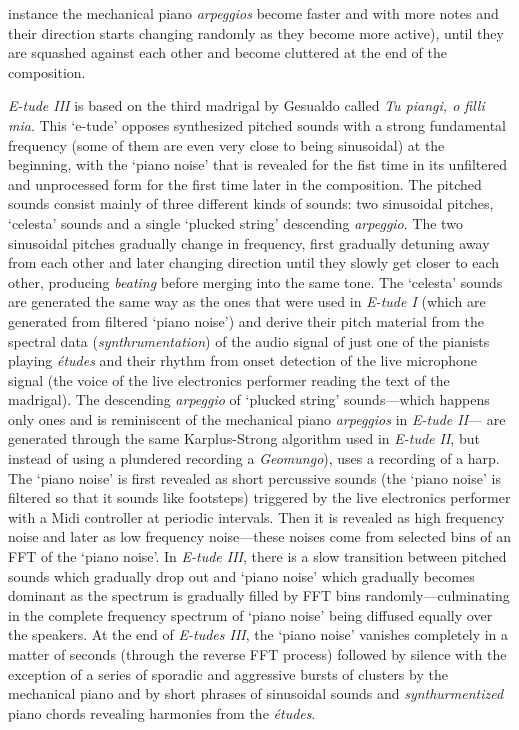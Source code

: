 instance the mechanical piano \emph{arpeggios} become faster and with more notes and their direction starts changing randomly as they become more active), until they are squashed against each other and become cluttered at the end of the composition.

\emph{E-tude III} is based on the third madrigal by Gesualdo called \emph{Tu piangi, o filli mia}. This `e-tude' opposes synthesized pitched sounds with a strong fundamental frequency (some of them are even very close to being sinusoidal) at the beginning, with the `piano noise' that is revealed for the fist time in its unfiltered and unprocessed form for the first time later in the composition. The pitched sounds consist mainly of three different kinds of sounds: two sinusoidal pitches, `celesta' sounds and a single `plucked string' descending \emph{arpeggio}. The two sinusoidal pitches gradually change in frequency, first gradually detuning away from each other and later changing direction until they slowly get closer to each other, producing \emph{beating} before merging into the same tone. The `celesta' sounds are generated the same way as the ones that were used in \emph{E-tude I} (which are generated from filtered `piano noise') and derive their pitch material from the spectral data (\emph{synthrumentation}) of the audio signal of just one of the pianists playing \emph{\'{e}tudes} and their rhythm from onset detection of the live microphone signal (the voice of the live electronics performer reading the text of the madrigal). The descending \emph{arpeggio} of `plucked string' sounds---which happens only ones and is reminiscent of the mechanical piano \emph{arpeggios} in \emph{E-tude II}--- are generated through the same Karplus-Strong algorithm used in \emph{E-tude II}, but instead of using a plundered recording a \emph{Geomungo}), uses a recording of a harp. The `piano noise' is first revealed as short percussive sounds (the `piano noise' is filtered so that it sounds like footsteps) triggered by the live electronics performer with a Midi controller at periodic intervals. Then it is revealed as high frequency noise and later as low frequency noise---these noises come from selected bins of an FFT of the `piano noise'. In \emph{E-tude III}, there is a slow transition between pitched sounds which gradually drop out and `piano noise' which gradually becomes dominant as the spectrum is gradually filled by FFT bins randomly---culminating in the complete frequency spectrum of `piano noise' being diffused equally over the speakers. At the end of \emph{E-tudes III}, the `piano noise' vanishes completely in a matter of seconds (through the reverse FFT process) followed by silence with the exception of a series of sporadic and aggressive bursts of clusters by the mechanical piano and by short phrases of sinusoidal sounds and \emph{synthurmentized} piano chords revealing harmonies from the \emph{\'{e}tudes}. 

